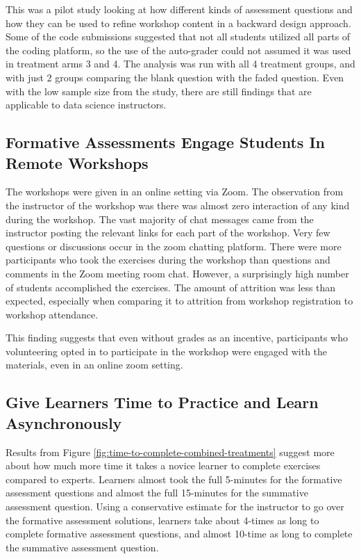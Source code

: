 \documentclass[040-assessment.tex]{subfiles}
\begin{document}
    This was a pilot study looking at how different kinds of assessment questions
    and how they can be used to refine workshop content in a backward design approach.
    Some of the code submissions suggested that not all students utilized all parts of the
    coding platform,
    so the use of the auto-grader could not assumed it was used in treatment arms 3 and 4.
    The analysis was run with all 4 treatment groups, and with just 2 groups comparing
    the blank question with the faded question.
    Even with the low sample size from the study,
    there are still findings that are applicable to data science instructors.

\subsection{Formative Assessments Engage Students In Remote Workshops}

    The workshops were given in an online setting via Zoom.
    The observation from the instructor of the workshop was there was almost zero
    interaction of any kind during the workshop.
    The vast majority of chat messages came from the instructor posting the
    relevant links for each part of the workshop.
    Very few questions or discussions occur in the zoom chatting platform.
    There were more participants who took the exercises during the workshop than
    questions and comments in the Zoom meeting room chat.
    However, a surprisingly high number of students accomplished the exercises.
    The amount of attrition was less than expected,
    especially when comparing it to attrition from workshop registration to workshop attendance.

    This finding suggests that even without grades as an incentive,
    participants who volunteering opted in to participate in the workshop
    were engaged with the materials, even in an online zoom setting.

\subsection{Give Learners Time to Practice and Learn Asynchronously}

    Results from Figure \ref{fig:time-to-complete-combined-treatments} suggest more about
    how much more time it takes a novice learner to complete exercises compared to experts.
    Learners almost took the full 5-minutes for the formative assessment questions and
    almost the full 15-minutes for the summative assessment question.
    Using a conservative estimate for the instructor to go over the formative assessment solutions,
    learners take about 4-times as long to complete formative assessment questions,
    and almost 10-time as long to complete the summative assessment question.
\end{document}
